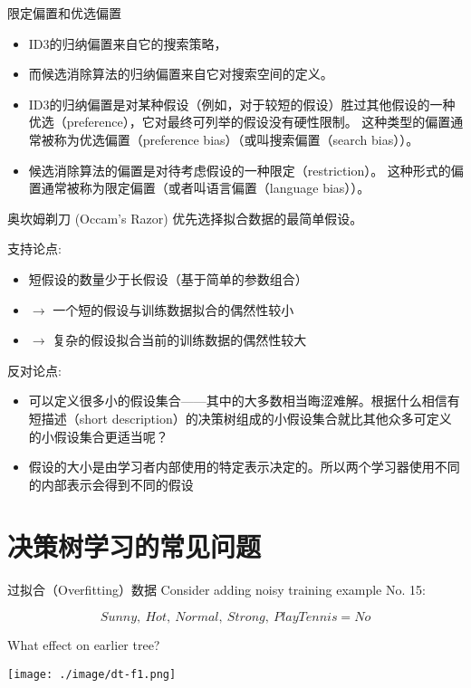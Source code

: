 \documentclass[presentation]{beamer}
\begin{document}
\begin{frame}[label={sec:orgf7a9347}]{限定偏置和优选偏置}
\begin{itemize}
\item ID3的归纳偏置来自它的搜索策略，
\item 而候选消除算法的归纳偏置来自它对搜索空间的定义。
\item ID3的归纳偏置是对某种假设（例如，对于较短的假设）胜过其他假设的一种优选（preference），它对最终可列举的假设没有硬性限制。
这种类型的偏置通常被称为优选偏置（preference bias）（或叫搜索偏置（search bias））。
\item 候选消除算法的偏置是对待考虑假设的一种限定（restriction）。
这种形式的偏置通常被称为限定偏置（或者叫语言偏置（language bias））。
\end{itemize}
\end{frame}

\begin{frame}[label={sec:orgf7ecd69}]{奥坎姆剃刀 (Occam's Razor)}
优先选择拟合数据的最简单假设。

支持论点:
\begin{itemize}
\item 短假设的数量少于长假设（基于简单的参数组合）
\item \(\rightarrow\) 一个短的假设与训练数据拟合的偶然性较小
\item \(\rightarrow\) 复杂的假设拟合当前的训练数据的偶然性较大
\end{itemize}

反对论点:
\begin{itemize}
\item 可以定义很多小的假设集合——其中的大多数相当晦涩难解。根据什么相信有短描述（short description）的决策树组成的小假设集合就比其他众多可定义的小假设集合更适当呢？
\item 假设的大小是由学习者内部使用的特定表示决定的。所以两个学习器使用不同的内部表示会得到不同的假设
\end{itemize}
\end{frame}

\section{决策树学习的常见问题}
\label{sec:orgd5b0c11}
\begin{frame}[label={sec:org357cbd6}]{过拟合（Overfitting）数据}
Consider adding noisy training example No. 15:

\[ Sunny,\  Hot,\  Normal,\  Strong,\ PlayTennis=No \]

What effect on earlier tree?

\begin{center}
\texttt{[image: ./image/dt-f1.png]}
\end{center}
\end{frame}
\end{document}
